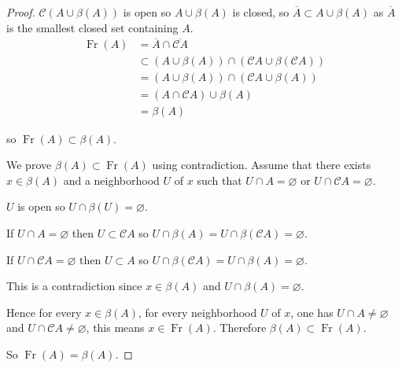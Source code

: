 \begin{proof}
    \( \mathscr{C}(A \cup \beta(A)) \) is open so \( A \cup \beta(A) \) is closed, so \( \overline{A} \subset A \cup \beta(A) \) as \( \overline{A} \) is the smallest closed set containing \(A\).
    \begingroup
    \allowdisplaybreaks%
    \begin{align*}
        \operatorname{Fr}(A) & = \overline{A} \cap \overline{\mathscr{C}A}                            \\
                             & \subset (A \cup \beta(A)) \cap (\mathscr{C}A \cup \beta(\mathscr{C}A)) \\
                             & = (A \cup \beta(A)) \cap (\mathscr{C}A \cup \beta(A))                  \\
                             & = (A \cap \mathscr{C}A) \cup \beta(A)                                  \\
                             & = \beta(A)
    \end{align*}
    \endgroup

    so \( \operatorname{Fr}(A) \subset \beta(A) \).

    We prove \( \beta(A) \subset \operatorname{Fr}(A) \) using contradiction. Assume that there exists \( x \in \beta(A) \) and a neighborhood \( U \) of \( x \) such that \( U \cap A = \varnothing \) or \( U \cap \mathscr{C}A = \varnothing \).

    \( U \) is open so \( U \cap \beta(U) = \varnothing \).

    If \( U \cap A = \varnothing \) then \( U \subset \mathscr{C}A \) so \( U \cap \beta(A) = U \cap \beta(\mathscr{C}A) = \varnothing \).

    If \( U \cap \mathscr{C}A = \varnothing \) then \( U \subset A \) so \( U \cap \beta(\mathscr{C}A) = U \cap \beta(A) = \varnothing \).

    This is a contradiction since \( x \in \beta(A) \) and \( U \cap \beta(A) = \varnothing \).

    Hence for every \( x \in \beta(A) \), for every neighborhood \( U \) of \(x\), one has \( U \cap A \ne \varnothing \) and \( U \cap \mathscr{C}A \ne \varnothing \), this means \( x \in \operatorname{Fr}(A) \). Therefore \( \beta(A) \subset \operatorname{Fr}(A) \).

    So \( \operatorname{Fr}(A) = \beta(A) \).
\end{proof}

